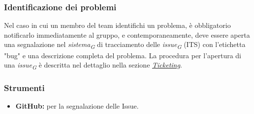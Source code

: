 \subsubsection{Identificazione dei problemi}
Nel caso in cui un membro del team identifichi un problema, è obbligatorio notificarlo immediatamente al gruppo, e contemporaneamente, deve essere aperta una segnalazione nel \textit{sistema}\textsubscript{\textit{G}} di tracciamento delle \textit{issue}\textsubscript{\textit{G}} (ITS) con l'etichetta "bug" e una descrizione completa del problema. La procedura per l'apertura di una \textit{issue}\textsubscript{\textit{G}} è descritta nel dettaglio nella sezione \hyperlink{par:ticketing}{\textit{Ticketing}}.

\subsubsection{Strumenti}
\begin{itemize}
    \item \textbf{GitHub:} per la segnalazione delle Issue.
\end{itemize}